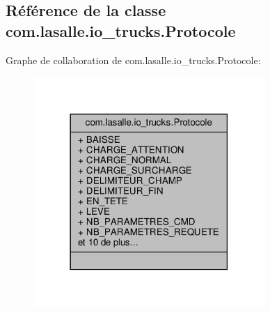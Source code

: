 \hypertarget{classcom_1_1lasalle_1_1io__trucks_1_1_protocole}{}\subsection{Référence de la classe com.\+lasalle.\+io\+\_\+trucks.\+Protocole}
\label{classcom_1_1lasalle_1_1io__trucks_1_1_protocole}


Graphe de collaboration de com.\+lasalle.\+io\+\_\+trucks.\+Protocole\+:
\nopagebreak
\begin{figure}[H]
\begin{center}
\leavevmode
\includegraphics[width=249pt]{classcom_1_1lasalle_1_1io__trucks_1_1_protocole__coll__graph}
\end{center}
\end{figure}
